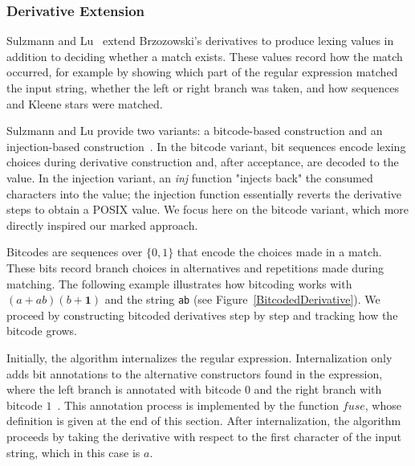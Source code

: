 \documentclass[12pt]{article}
\newcommand{\ONE}{\textbf{1}}
\newcommand{\fuse}{\textit{fuse}}
\begin{document}
\FloatBarrier
\subsubsection{Derivative Extension}

Sulzmann and Lu~\cite{Sulzmann2014} extend Brzozowski’s derivatives to produce 
lexing values in addition to deciding whether a match exists. 
These values record how the match occurred, for example by showing which part
of the regular expression matched the input string, whether the left or right
branch was taken, and how sequences and Kleene stars were matched.

Sulzmann and Lu provide two variants: a bitcode-based construction and an
injection-based construction~\cite{Sulzmann2014}.  
In the bitcode variant, bit sequences encode lexing choices during derivative
construction and, after acceptance, are decoded to the value. In the injection
variant, an \textit{inj} function "injects back" the consumed characters into
the value; the injection function essentially reverts the derivative steps to
obtain a POSIX value. We focus here on the bitcode variant, which more directly
inspired our marked approach.

Bitcodes are sequences over $\{0,1\}$ that encode the choices made in a match. These bits record
branch choices in alternatives and repetitions made during matching. The following example
illustrates how bitcoding works with $(a+ab)(b+\ONE)$ and the string \texttt{ab} (see
Figure~\ref{BitcodedDerivative}). We proceed by constructing bitcoded derivatives step by step
and tracking how the bitcode grows.

Initially, the algorithm internalizes the regular expression.  
Internalization only adds bit annotations to the alternative constructors found in the expression, 
where the left branch is annotated with bitcode $0$ and the right branch with bitcode $1$~\cite{Sulzmann2014}.  
This annotation process is implemented by the function $\fuse$, whose definition is given at the end of this section.  
After internalization, the algorithm proceeds by taking the derivative with respect to the first character 
of the input string, which in this case is $a$.
\end{document}
